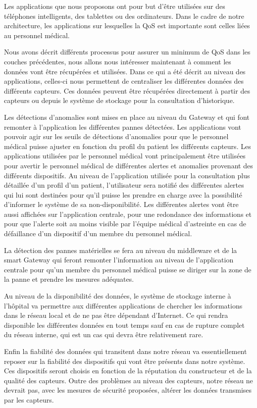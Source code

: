 Les applications que nous proposons ont pour but d’être utilisées sur des téléphones intelligents, des tablettes ou des ordinateurs. Dans le cadre de notre architecture, les applications sur lesquelles la QoS est importante sont celles liées au personnel médical.

Nous avons décrit différents processus pour assurer un minimum de QoS dans les couches précédentes, nous allons nous intéresser maintenant à comment les données vont être récupérées et utilisées. Dans ce qui a été décrit au niveau des applications, celles-ci nous permettent de centraliser les différentes données des différents capteurs. Ces données peuvent être récupérées directement à partir des capteurs ou depuis le système de stockage pour la consultation d’historique.

Les détections d’anomalies sont mises en place au niveau du Gateway et qui font remonter à l’application les différentes pannes détectées. Les applications vont pouvoir agir sur les seuils de détections d’anomalies pour que le personnel médical puisse ajuster en fonction du profil du patient les différents capteurs. Les applications utilisées par le personnel médical vont principalement être utilisées pour avertir le personnel médical de différentes alertes et anomalies provenant des différents dispositifs. Au niveau de l’application utilisée pour la consultation plus détaillée d’un profil d’un patient, l’utilisateur sera notifié des différentes alertes qui lui sont destinées pour qu’il puisse les prendre en charge avec la possibilité d’informer le système de sa non-disponibilité. Les différentes alertes vont être aussi affichées sur l’application centrale, pour une redondance des informations et pour que l’alerte soit au moins visible par l’équipe médical d’astreinte en cas de défaillance d’un dispositif d’un membre du personnel médical.

La détection des pannes matérielles se fera au niveau du middleware et de la smart Gateway qui feront remonter l’information au niveau de l’application centrale pour qu’un membre du personnel médical puisse se diriger sur la zone de la panne et prendre les mesures adéquates.

Au niveau de la disponibilité des données, le système de stockage interne à l’hôpital va permettre aux différentes applications de chercher les informations dans le réseau local et de ne pas être dépendant d’Internet.  Ce qui rendra disponible les différentes données en tout temps sauf en cas de rupture complet du réseau interne, qui est un cas qui devra être relativement rare.

Enfin la fiabilité des données qui transitent dans notre réseau va essentiellement reposer sur la fiabilité des dispositifs qui vont être présents dans notre système. Ces dispositifs seront choisis en fonction de la réputation du constructeur et de la qualité des capteurs. Outre des problèmes au niveau des capteurs, notre réseau ne devrait pas, avec les mesures de sécurité proposées, altérer les données transmises par les capteurs.      